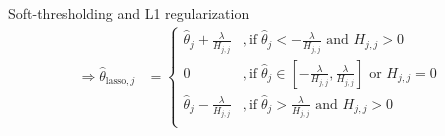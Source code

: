 \documentclass[11pt,compress,t,notes=noshow, xcolor=table]{beamer}
\begin{document}
\begin{vbframe}{Soft-thresholding and L1 regularization}
\begin{align*}\Rightarrow \hat{\theta}_{\text{lasso},j} &= \begin{cases} 
     \hat{\theta}_j + \frac{\lambda}{H_{j,j}} &, \text{if}   \;\hat{\theta}_j < -\frac{\lambda}{H_{j,j}} \text{ and } H_{j,j} > 0\\
       0 &, \text{if}   \;\hat{\theta}_j \in [-\frac{\lambda}{H_{j,j}}, \frac{\lambda}{H_{j,j}}] \text{ or } H_{j,j} = 0\\
     \hat{\theta}_j - \frac{\lambda}{H_{j,j}} &, \text{if}   \;\hat{\theta}_j > \frac{\lambda}{H_{j,j}} \text{ and } H_{j,j} > 0 \\
     \end{cases}
     \end{align*}

\end{vbframe}

\endlecture
\end{document}

